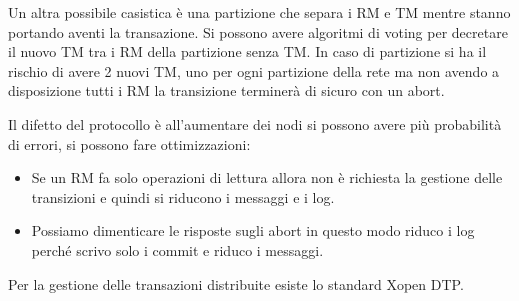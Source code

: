 Un altra possibile casistica è una partizione che separa i RM e TM mentre stanno
portando aventi la transazione. Si possono avere algoritmi di voting per decretare 
il nuovo TM tra i RM della partizione senza TM. In caso di partizione si
ha il rischio di avere 2 nuovi TM, uno per ogni partizione della rete ma non
avendo a disposizione tutti i RM la transizione terminerà di sicuro con un abort.

Il difetto del protocollo è all'aumentare dei nodi si possono avere più probabilità
di errori, si possono fare ottimizzazioni:
\begin{itemize}
    \item Se un RM fa solo operazioni di lettura allora non è richiesta la
          gestione delle transizioni e quindi si riducono i messaggi e i log.
    \item Possiamo dimenticare le risposte sugli abort in questo modo riduco
          i log perché scrivo solo i commit e riduco i messaggi.
\end{itemize}

Per la gestione delle transazioni distribuite esiste lo standard Xopen DTP.
